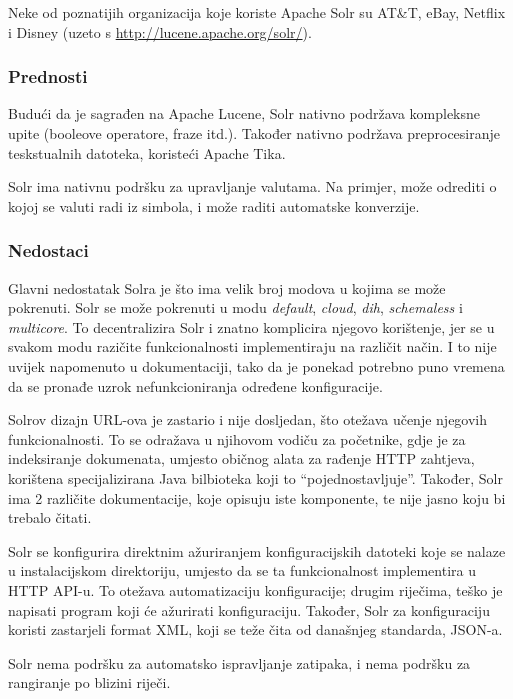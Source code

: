 \documentclass[a4paper,twoside,12pt]{scrreprt}
\begin{document}
Neke od poznatijih organizacija koje koriste Apache Solr su AT\&T, eBay, Netflix i Disney (uzeto s \url{http://lucene.apache.org/solr/}).

\subsubsection{Prednosti}

Budući da je sagrađen na Apache Lucene, Solr nativno podržava kompleksne upite (booleove operatore, fraze itd.). Također nativno podržava preprocesiranje teskstualnih datoteka, koristeći Apache Tika.

Solr ima nativnu podršku za upravljanje valutama. Na primjer, može odrediti o kojoj se valuti radi iz simbola, i može raditi automatske konverzije.

\subsubsection{Nedostaci}

Glavni nedostatak Solra je što ima velik broj modova u kojima se može pokrenuti. Solr se može pokrenuti u modu \textit{default}, \textit{cloud}, \textit{dih}, \textit{schemaless} i \textit{multicore}. To decentralizira Solr i znatno komplicira njegovo korištenje, jer se u svakom modu razičite funkcionalnosti implementiraju na različit način. I to nije uvijek napomenuto u dokumentaciji, tako da je ponekad potrebno puno vremena da se pronađe uzrok nefunkcioniranja određene konfiguracije.

Solrov dizajn URL-ova je zastario i nije dosljedan, što otežava učenje njegovih funkcionalnosti. To se odražava u njihovom vodiču za početnike, gdje je za indeksiranje dokumenata, umjesto običnog alata za rađenje HTTP zahtjeva, korištena specijalizirana Java bilbioteka koji to ``pojednostavljuje''. Također, Solr ima 2 različite dokumentacije, koje opisuju iste komponente, te nije jasno koju bi trebalo čitati.

Solr se konfigurira direktnim ažuriranjem konfiguracijskih datoteki koje se nalaze u instalacijskom direktoriju, umjesto da se ta funkcionalnost implementira u HTTP API-u. To otežava automatizaciju konfiguracije; drugim riječima, teško je napisati program koji će ažurirati konfiguraciju. Također, Solr za konfiguraciju koristi zastarjeli format XML, koji se teže čita od današnjeg standarda, JSON-a.

Solr nema podršku za automatsko ispravljanje zatipaka, i nema podršku za rangiranje po blizini riječi.
\end{document}
